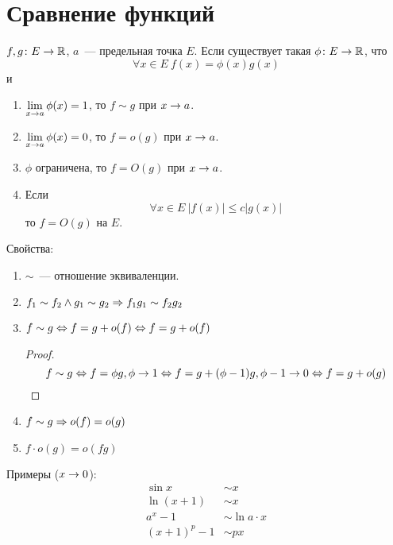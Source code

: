 \section{Сравнение функций}

\begin{Def}
$f,g\colon E \rightarrow \mathbb{R}$, $a$~--- предельная точка $E$. Если существует такая $\phi\colon E \rightarrow \mathbb{R}$, что
$$\forall x\in E\: f(x) = \phi(x) g(x)$$
и
\begin{enumerate}
\item $\lim\limits_{x\rightarrow a} \phi(x) = 1$, то $f \sim g$ при $x \rightarrow a$.
\item $\lim\limits_{x\rightarrow a} \phi(x) = 0$, то $f = o(g)$ при $x \rightarrow a$.
\item $\phi$ ограничена, то $f = O(g)$ при $x \rightarrow a$.
\item Если 
$$\forall x \in E\: |f(x)| \leqslant c|g(x)|$$
то $f = O(g)$ на $E$.
\end{enumerate}
\end{Def}

Свойства:
\begin{enumerate}
\item $\sim$~--- отношение эквиваленции.
\item $f_1 \sim f_2 \land g_1 \sim g_2 \Rightarrow f_1g_1 \sim f_2g_2$
\item $f \sim g \Leftrightarrow f = g + o(f) \Leftrightarrow f = g + o(f)$ 
\begin{proof}
$$f \sim g \Leftrightarrow f = \phi g, \phi \rightarrow 1 \Leftrightarrow f = g + (\phi - 1) g, \phi - 1 \rightarrow 0 \Leftrightarrow f = g + o(g)$$
\end{proof}
\item $f \sim g \Rightarrow o(f) = o(g)$
\item $f \cdot o(g) = o(fg)$
\end{enumerate}

Примеры ($x \rightarrow 0$):
\begin{align*}
\sin x &\sim x \\
\ln(x + 1) &\sim x \\
a^x - 1 &\sim \ln a \cdot x \\
(x+1)^p - 1 &\sim px 
\end{align*}